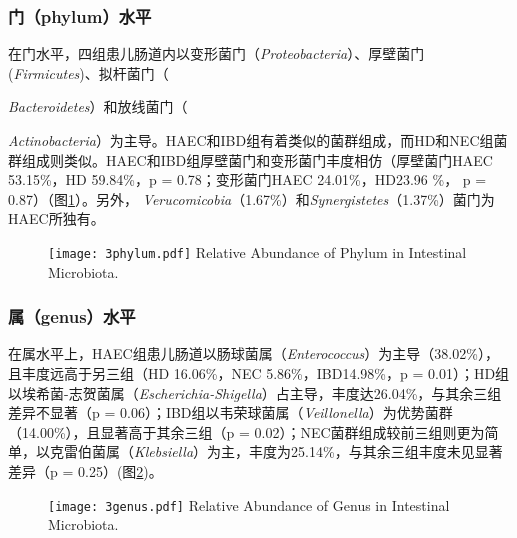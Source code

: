     \subsubsection{门（phylum）水平}
    在门水平，四组患儿肠道内以变形菌门（\textit{Proteobacteria}）、厚壁菌门(\textit{Firmicutes})、拟杆菌门（{\textit{Bacteroidetes}）和放线菌门（{\textit{Actinobacteria}）为主导。HAEC和IBD组有着类似的菌群组成，而HD和NEC组菌群组成则类似。HAEC和IBD组厚壁菌门和变形菌门丰度相仿（厚壁菌门HAEC 53.15\%，HD 59.84\%，p = 0.78；变形菌门HAEC 24.01\%，HD23.96 \%， p = 0.87）（图\ref{fig:3phylum}）。另外， \textit{Verucomicobia}（1.67\%）和\textit{Synergistetes}（1.37\%）菌门为HAEC所独有。
      \begin{figure}[!htp]
        \centering
        \texttt{[image: 3phylum.pdf]}
          {Relative Abundance of Phylum in Intestinal Microbiota.}
        \label{fig:3phylum}
      \end{figure}

    \subsubsection{属（genus）水平}
    在属水平上，HAEC组患儿肠道以肠球菌属（\textit{Enterococcus}）为主导（38.02\%），且丰度远高于另三组（HD 16.06\%，NEC 5.86\%，IBD14.98\%，p = 0.01）；HD组以埃希菌-志贺菌属（\textit{Escherichia-Shigella}）占主导，丰度达26.04\%，与其余三组差异不显著（p = 0.06）；IBD组以韦荣球菌属（\textit{Veillonella}）为优势菌群（14.00\%），且显著高于其余三组（p = 0.02）；NEC菌群组成较前三组则更为简单，以克雷伯菌属（\textit{Klebsiella}）为主，丰度为25.14\%，与其余三组丰度未见显著差异（p = 0.25）(图\ref{fig:3genus})。
      \begin{figure}[!htp]
        \centering
        \texttt{[image: 3genus.pdf]}
          {Relative Abundance of Genus in Intestinal Microbiota.}
        \label{fig:3genus}
      \end{figure}

}}
